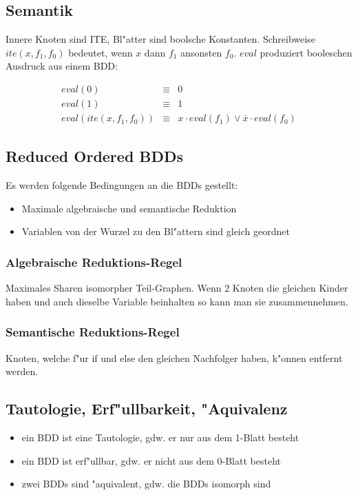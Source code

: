 \documentclass[german, 10pt, a4paper, twocolumn]{scrartcl}
\theoremstyle{definition}
\begin{document}
\subsection{Semantik}

Innere Knoten sind ITE, Bl"atter sind boolsche Konstanten. Schreibweise $ite(x,f_1,f_0)$ bedeutet, wenn $x$ dann $f_1$ ansonsten $f_0$. $eval$ produziert booleschen Ausdruck aus einem BDD:

\begin{eqnarray}
	eval(0) &	\equiv &	0\\
	eval(1) &	\equiv &	1 \\
	eval(ite(x,f_1,f_0)) &	\equiv &	x \cdotp eval(f_1) \lor \overline{x} \cdotp eval(f_0)
\end{eqnarray}

\subsection{Reduced Ordered BDDs}

Es werden folgende Bedingungen an die BDDs gestellt:
\begin{itemize}
	\item Maximale algebraische und semantische Reduktion
	\item Variablen von der Wurzel zu den Bl"attern sind gleich geordnet
\end{itemize}

\subsubsection{Algebraische Reduktions-Regel}

Maximales Sharen isomorpher Teil-Graphen. Wenn 2 Knoten die gleichen Kinder haben und auch dieselbe Variable beinhalten so kann man sie zusammennehmen.

\subsubsection{Semantische Reduktions-Regel}

Knoten, welche f"ur if und else den gleichen Nachfolger haben, k"onnen entfernt werden.

\subsection{Tautologie, Erf"ullbarkeit, "Aquivalenz}

\begin{itemize}
	\item ein BDD ist eine Tautologie, gdw. er nur aus dem 1-Blatt besteht
	\item ein BDD ist erf"ullbar, gdw. er nicht aus dem 0-Blatt besteht
	\item zwei BDDs sind "aquivalent, gdw. die BDDs isomorph sind
\end{itemize}
\end{document}
